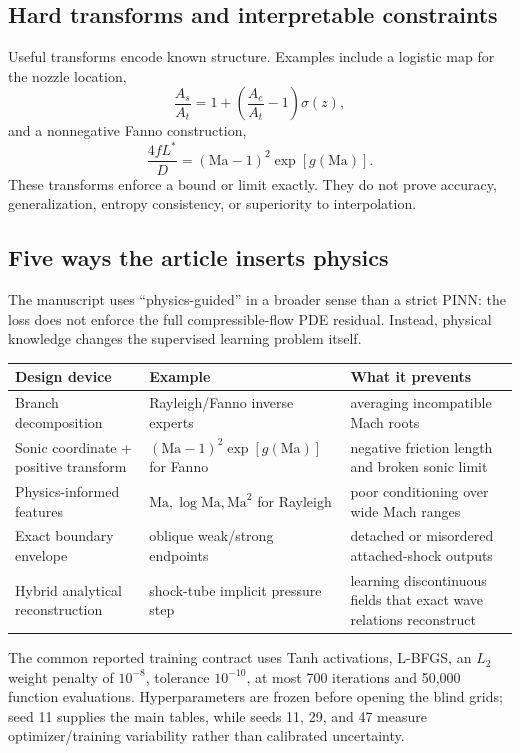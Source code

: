 \documentclass[11pt]{article}
\newcommand{\Ma}{\mathrm{Ma}}
\begin{document}
\subsection{Hard transforms and interpretable constraints}
Useful transforms encode known structure. Examples include a logistic map for
the nozzle location,
\begin{equation}
\frac{A_s}{A_t}=1+\left(\frac{A_e}{A_t}-1\right)\sigma(z),
\end{equation}
and a nonnegative Fanno construction,
\begin{equation}
\frac{4fL^*}{D}=(\Ma-1)^2\exp[g(\Ma)].
\end{equation}
These transforms enforce a bound or limit exactly. They do not prove accuracy,
generalization, entropy consistency, or superiority to interpolation.

\subsection{Five ways the article inserts physics}
The manuscript uses ``physics-guided'' in a broader sense than a strict PINN:
the loss does not enforce the full compressible-flow PDE residual. Instead,
physical knowledge changes the supervised learning problem itself.
\begin{center}
\begin{tabular}{p{}p{}p{}}
\toprule
Design device & Example & What it prevents \\
\midrule
Branch decomposition & Rayleigh/Fanno inverse experts & averaging incompatible Mach roots \\
Sonic coordinate + positive transform & $(\Ma-1)^2\exp[g(\Ma)]$ for Fanno & negative friction length and broken sonic limit \\
Physics-informed features & $\Ma,\log\Ma,\Ma^2$ for Rayleigh & poor conditioning over wide Mach ranges \\
Exact boundary envelope & oblique weak/strong endpoints & detached or misordered attached-shock outputs \\
Hybrid analytical reconstruction & shock-tube implicit pressure step & learning discontinuous fields that exact wave relations reconstruct \\
\bottomrule
\end{tabular}
\end{center}

The common reported training contract uses Tanh activations, L-BFGS, an
$L_2$ weight penalty of $10^{-8}$, tolerance $10^{-10}$, at most 700 iterations
and 50,000 function evaluations. Hyperparameters are frozen before opening the
blind grids; seed 11 supplies the main tables, while seeds 11, 29, and 47 measure
optimizer/training variability rather than calibrated uncertainty.
\end{document}
